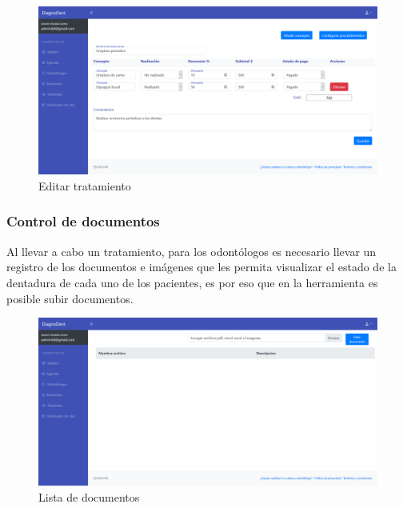 \begin{figure}[H]
\centering
\includegraphics[width=17cm,keepaspectratio]{pictures/adminodo/pacientes/presupuestos/editar-tratamiento.png}
\caption{Editar tratamiento}
\end{figure}




\subsubsection{Control de documentos}

Al llevar a cabo un tratamiento, para los odontólogos es necesario llevar un registro de los documentos e imágenes que les permita visualizar el estado de la dentadura de cada uno de los pacientes, es por eso que en la herramienta es posible subir documentos.

\begin{figure}[H]
\centering
\includegraphics[width=17cm,keepaspectratio]{pictures/adminodo/pacientes/documentos/lista-documentos-1.png}
\caption{Lista de documentos}
\end{figure}

